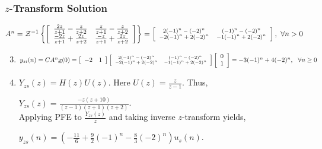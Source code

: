 \documentclass[mathserif, 10pt]{beamer} %
\def\x{\underline{x}}
\begin{document}
\frame
{

\renewcommand{\theenumi}{\alph{enumi}}
\frametitle{$z$-Transform Solution}

\hspace{-.2in}
$A^n =\mathcal{Z}^{-1} \left\{ \left[
\begin{array}{cc}
\frac{2z}{z+1}-\frac{z}{z+2}&\frac{z}{z+1}-\frac{z}{z+2}\\
\frac{-2z}{z+1}+\frac{2z}{z+2}&\frac{-z}{z+1}+\frac{2z}{z+2}
\end{array} \right] \right\} = \left[
\scriptsize{\begin{array}{cc}
	2(-1)^n-(-2)^n&(-1)^n-(-2)^n\\
	-2(-1)^n+2(-2)^n& -1(-1)^n+2(-2)^n
\end{array}} \right], ~\forall n>0$ \\

\begin{enumerate}
	\setcounter{enumi}{2}

\item 

$y_{zi}(n)=CA^n\x(0) = \left[
\begin{array}{cc}
	-2& 1
\end{array} \right] \left[
\scriptsize{\begin{array}{cc}
	2(-1)^n-(-2)^n&(-1)^n-(-2)^n\\
	-2(-1)^n+2(-2)^n& -1(-1)^n+2(-2)^n
\end{array}} \right] \left[
\begin{array}{c}
	0\\
	1
\end{array} \right]=-3(-1)^n + 4(-2)^n, ~~\forall n\geq 0$ 

\item 

$Y_{zs}(z)=H(z) U(z)$. Here $U(z)=\frac{z}{z-1}$. Thus, \\ \vspace{.1in}

$Y_{zs}(z)=\frac{-z(z+10)}{(z-1)(z+1)(z+2)}$. \\ \vspace{.1in}
Applying PFE to $\frac{Y_{zs}(z)}{z}$ and taking inverse $z$-transform yields, \\ \vspace{.1in}

$y_{zs}(n)=(-\frac{11}{6}+\frac{9}{2}(-1)^n-\frac{8}{3}(-2)^n)u_s(n).$


\end{enumerate}
}
\end{document}
